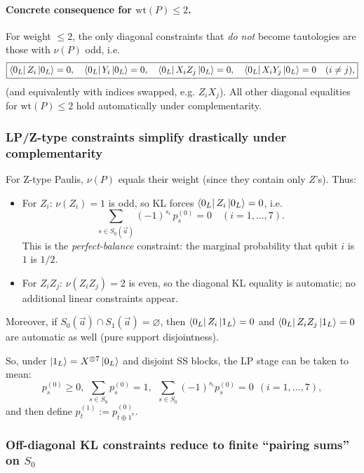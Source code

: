 \documentclass[11pt]{article}
\begin{document}
\paragraph{Concrete consequence for \(\mathrm{wt}(P)\le 2\).}
For weight \(\le 2\), the only diagonal constraints that \emph{do not} become tautologies are those with \(\nu(P)\) odd, i.e.
\[
\boxed{
\bra{0_L}Z_i\ket{0_L}=0,\quad
\bra{0_L}Y_i\ket{0_L}=0,\quad
\bra{0_L}X_iZ_j\ket{0_L}=0,\quad
\bra{0_L}X_iY_j\ket{0_L}=0
\quad (i\neq j),
}
\]
(and equivalently with indices swapped, e.g. \(Z_iX_j\)).
All other diagonal equalities for \(\mathrm{wt}(P)\le 2\) hold automatically under complementarity.

\subsubsection{LP/Z-type constraints simplify drastically under complementarity}

For Z-type Paulis, \(\nu(P)\) equals their weight (since they contain only \(Z\)'s).
Thus:
\begin{itemize}
\item For \(Z_i\): \(\nu(Z_i)=1\) is odd, so KL forces \(\bra{0_L}Z_i\ket{0_L}=0\), i.e.
\[
\boxed{
\sum_{s\in S_0(\vec a)} (-1)^{s_i}\,p^{(0)}_s = 0\quad (i=1,\dots,7).
}
\]
This is the \emph{perfect-balance} constraint: the marginal probability that qubit \(i\) is \(1\) is \(1/2\).
\item For \(Z_iZ_j\): \(\nu(Z_iZ_j)=2\) is even, so the diagonal KL equality is automatic; no additional linear constraints appear.
\end{itemize}
Moreover, if \(S_0(\vec a)\cap S_1(\vec a)=\varnothing\), then \(\bra{0_L}Z_i\ket{1_L}=0\)
and \(\bra{0_L}Z_iZ_j\ket{1_L}=0\) are automatic as well (pure support disjointness).

So, under \(\ket{1_L}=X^{\otimes 7}\ket{0_L}\) and disjoint SS blocks, the LP stage can be taken to mean:
\[
\boxed{
p^{(0)}_s\ge 0,\ \sum_{s\in S_0}p^{(0)}_s=1,\ \ \sum_{s\in S_0}(-1)^{s_i}p^{(0)}_s=0\ \ (i=1,\dots,7),
}
\]
and then define \(p^{(1)}_t:=p^{(0)}_{t\oplus 1^7}\).

\subsubsection{Off-diagonal KL constraints reduce to finite ``pairing sums'' on \texorpdfstring{$S_0$}{S0}}
\end{document}
